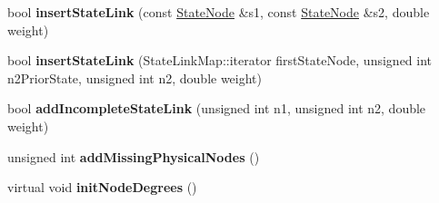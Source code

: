 \begin{DoxyCompactItemize}
\item 
\mbox{\label{classMemNetwork_a77997b6d47b209c195e37026338fd34c}} 
bool {\bfseries insert\+State\+Link} (const \mbox{\hyperlink{structStateNode}{State\+Node}} \&s1, const \mbox{\hyperlink{structStateNode}{State\+Node}} \&s2, double weight)
\item 
\mbox{\label{classMemNetwork_a4d09b351573739a7956ce1db3926aa57}} 
bool {\bfseries insert\+State\+Link} (State\+Link\+Map\+::iterator first\+State\+Node, unsigned int n2\+Prior\+State, unsigned int n2, double weight)
\item 
\mbox{\label{classMemNetwork_a41ddbd68bad604a6750fa709013f0cb2}} 
bool {\bfseries add\+Incomplete\+State\+Link} (unsigned int n1, unsigned int n2, double weight)
\item 
\mbox{\label{classMemNetwork_acd3e449e39cdd1b841aa65496aee3680}} 
unsigned int {\bfseries add\+Missing\+Physical\+Nodes} ()
\item 
\mbox{\label{classMemNetwork_a7ab065a52785f969762a60146476e2fe}} 
virtual void {\bfseries init\+Node\+Degrees} ()
\end{DoxyCompactItemize}

